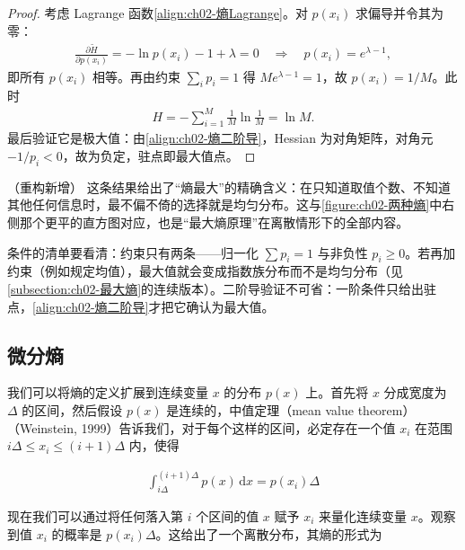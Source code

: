 \documentclass[../../main.tex]{subfiles}
\begin{document}
\begin{proof}
考虑 Lagrange 函数\eqref{align:ch02-熵Lagrange}。对 $p(x_i)$ 求偏导并令其为零：
\begin{align*}
  \frac{\partial\tilde{H}}{\partial p(x_i)} = -\ln p(x_i) - 1 + \lambda = 0
  \quad\Longrightarrow\quad
  p(x_i) = e^{\lambda-1} ,
\end{align*}
即所有 $p(x_i)$ 相等。再由约束 $\sum_ip_i=1$ 得 $Me^{\lambda-1}=1$，故 $p(x_i)=1/M$。此时
\begin{align*}
  H = -\sum_{i=1}^{M}\frac{1}{M}\ln\frac{1}{M} = \ln M .
\end{align*}
最后验证它是极大值：由\eqref{align:ch02-熵二阶导}，Hessian 为对角矩阵，对角元 $-1/p_i<0$，故为负定，驻点即最大值点。
\end{proof}

\begin{remark}（重构新增）
这条结果给出了“熵最大”的精确含义：在只知道取值个数、不知道其他任何信息时，最不偏不倚的选择就是均匀分布。这与\cref{figure:ch02-两种熵}中右侧那个更平的直方图对应，也是“最大熵原理”在离散情形下的全部内容。

条件的清单要看清：约束只有两条——归一化 $\sum p_i=1$ 与非负性 $p_i\geqslant0$。若再加约束（例如规定均值），最大值就会变成指数族分布而不是均匀分布（见\cref{subsection:ch02-最大熵}的连续版本）。二阶导验证不可省：一阶条件只给出驻点，\eqref{align:ch02-熵二阶导}才把它确认为最大值。
\end{remark}

\subsection{微分熵}\label{subsection:ch02-微分熵}

我们可以将熵的定义扩展到连续变量 $x$ 的分布 $p(x)$ 上。首先将 $x$ 分成宽度为 $\Delta$ 的区间，然后假设 $p(x)$ 是连续的，中值定理（mean value theorem）（Weinstein, 1999）告诉我们，对于每个这样的区间，必定存在一个值 $x_i$ 在范围 $i\Delta\leqslant x_i\leqslant(i+1)\Delta$ 内，使得

\begin{align}
  \int_{i\Delta}^{(i+1)\Delta} p(x)\,\mathrm{d}x = p(x_i)\Delta
  \label{align:ch02-中值定理}
\end{align}

现在我们可以通过将任何落入第 $i$ 个区间的值 $x$ 赋予 $x_i$ 来量化连续变量 $x$。观察到值 $x_i$ 的概率是 $p(x_i)\Delta$。这给出了一个离散分布，其熵的形式为
\end{document}
